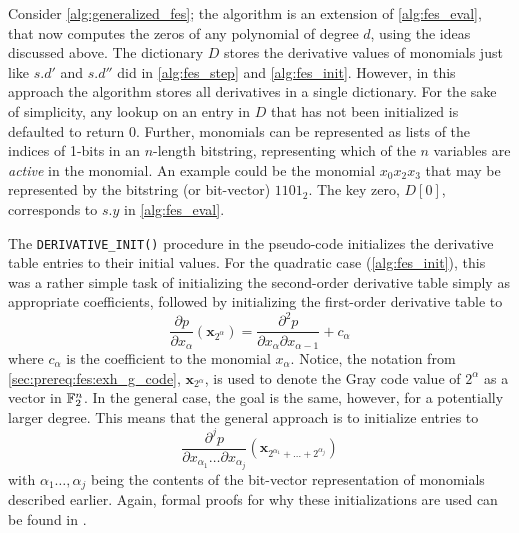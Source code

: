 Consider \cref{alg:generalized_fes}; the algorithm is an extension of \cref{alg:fes_eval}, that now computes the zeros of any polynomial of degree $d$, using the ideas discussed above. The dictionary $D$ stores the derivative values of monomials just like $s.d'$ and $s.d''$ did in \cref{alg:fes_step} and \cref{alg:fes_init}. However, in this approach the algorithm stores all derivatives in a single dictionary. For the sake of simplicity, any lookup on an entry in $D$ that has not been initialized is defaulted to return $0$. Further, monomials can be represented as lists of the indices of 1-bits in an $n$-length bitstring, representing which of the $n$ variables are \textit{active} in the monomial. An example could be the monomial $x_0x_2x_3$ that may be represented by the bitstring (or bit-vector) $1101_2$. The key zero, $D[0]$, corresponds to $s.y$ in \cref{alg:fes_eval}.

The \texttt{DERIVATIVE\_INIT()} procedure in the pseudo-code initializes the derivative table entries to their initial values. For the quadratic case (\cref{alg:fes_init}), this was a rather simple task of initializing the second-order derivative table simply as appropriate coefficients, followed by initializing the first-order derivative table to 
$$
    \frac{\partial p}{\partial x_\alpha}(\mathbf{x}_{2^\alpha}) = \frac{\partial^2 p}{\partial x_{\alpha} \partial x_{\alpha - 1}} + c_\alpha
$$
where $c_\alpha$ is the coefficient to the monomial $x_\alpha$. Notice, the notation from \cref{sec:prereq:fes:exh_g_code}, $\mathbf{x}_{2^\alpha}$, is used to denote the Gray code value of $2^\alpha$ as a vector in $\mathbb{F}_2^n$. In the general case, the goal is the same, however, for a potentially larger degree. This means that the general approach is to initialize entries to 
$$
    \frac{\partial^j p}{\partial x_{\alpha_1} \dots \partial x_{\alpha_j}}(\mathbf{x}_{2^{\alpha_1} + \dots + 2^{\alpha_j}})
$$
with $\alpha_1 \dots, \alpha_j$ being the contents of the bit-vector representation of monomials described earlier. Again, formal proofs for why these initializations are used can be found in \cite{tungchoumasters}.

